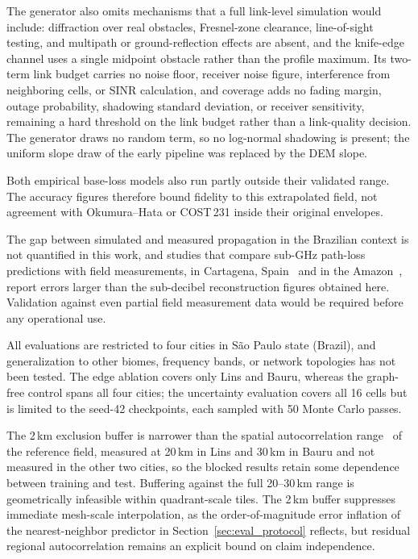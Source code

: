 \documentclass{ieeeaccess}
\begin{document}
The generator also omits mechanisms that a full link-level simulation would include: diffraction over real obstacles, Fresnel-zone clearance, line-of-sight testing, and multipath or ground-reflection effects are absent, and the knife-edge channel uses a single midpoint obstacle rather than the profile maximum. Its two-term link budget carries no noise floor, receiver noise figure, interference from neighboring cells, or SINR calculation, and coverage adds no fading margin, outage probability, shadowing standard deviation, or receiver sensitivity, remaining a hard threshold on the link budget rather than a link-quality decision. The generator draws no random term, so no log-normal shadowing is present; the uniform slope draw of the early pipeline was replaced by the DEM slope.

Both empirical base-loss models also run partly outside their validated range. The accuracy figures therefore bound fidelity to this extrapolated field, not agreement with Okumura--Hata or COST\,231 inside their original envelopes.

The gap between simulated and measured propagation in the Brazilian context is not quantified in this work, and studies that compare sub-GHz path-loss predictions with field measurements, in Cartagena, Spain~\cite{lorentelpez2026machine} and in the Amazon~\cite{lima2024lora}, report errors larger than the sub-decibel reconstruction figures obtained here. Validation against even partial field measurement data would be required before any operational use.

All evaluations are restricted to four cities in S\~{a}o Paulo state (Brazil), and generalization to other biomes, frequency bands, or network topologies has not been tested. The edge ablation covers only Lins and Bauru, whereas the graph-free control spans all four cities; the uncertainty evaluation covers all 16 cells but is limited to the seed-42 checkpoints, each sampled with 50 Monte Carlo passes.

The 2\,km exclusion buffer is narrower than the spatial autocorrelation range~\cite{valavi2019blockcv} of the reference field, measured at 20\,km in Lins and 30\,km in Bauru and not measured in the other two cities, so the blocked results retain some dependence between training and test. Buffering against the full 20--30\,km range is geometrically infeasible within quadrant-scale tiles. The 2\,km buffer suppresses immediate mesh-scale interpolation, as the order-of-magnitude error inflation of the nearest-neighbor predictor in Section~\ref{sec:eval_protocol} reflects, but residual regional autocorrelation remains an explicit bound on claim independence.
\end{document}
